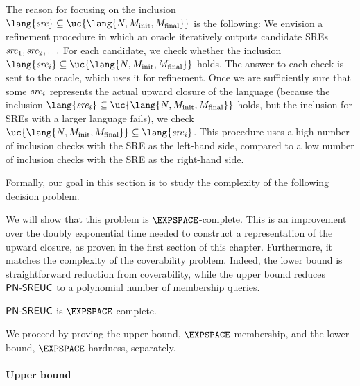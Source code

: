 \documentclass[../../diss.tex]{subfiles}
\begin{document}
The reason for focusing on the inclusion $\lang{\sre} \subseteq \uc{\lang{N,M_\init,M_\final}}$ is the following:
We envision a refinement procedure in which an oracle iteratively outputs candidate SREs $\mathit{sre}_1, \mathit{sre}_2, \ldots$%
For each candidate, we check whether the inclusion $\lang{\sre_i} \subseteq \uc{\lang{N,M_\init,M_\final}}$ holds.
The answer to each check is sent to the oracle, which uses it for refinement.
Once we are sufficiently sure that some $\mathit{sre}_i$ represents the actual upward closure of the language (\eg because the inclusion $\lang{\sre_i} \subseteq \uc{\lang{N,M_\init,M_\final}}$ holds, but the inclusion for SREs with a larger language  fails), we check $\uc{\lang{N,M_\init,M_\final}} \subseteq \lang{\sre_i}$.
This procedure uses a high number of inclusion checks with the SRE as the left-hand side, compared to a low number of inclusion checks with the SRE as the right-hand side.

%
\cheatpagebreak
%

Formally, our goal in this section is to study the complexity of the following decision problem.

\begin{problem}
    \problemshort{($\SREUC$)}
\end{problem}

We will show that this problem is $\EXPSPACE$-complete.
This is an improvement over the doubly exponential time needed to construct a representation of the upward closure, as proven in the first section of this chapter.
Furthermore, it matches the complexity of the coverability problem.
Indeed, the lower bound is straightforward reduction from coverability, while the upper bound reduces $\SREUC$ to a polynomial number of membership queries.

\begin{theorem}%
\label{Theorem:PNSREUC}%
    $\SREUC$ is $\EXPSPACE$-complete.
\end{theorem}

We proceed by proving the upper bound, \ie $\EXPSPACE$ membership, and the lower bound, $\EXPSPACE$-hardness, separately.

\paragraph{Upper bound}
\end{document}
